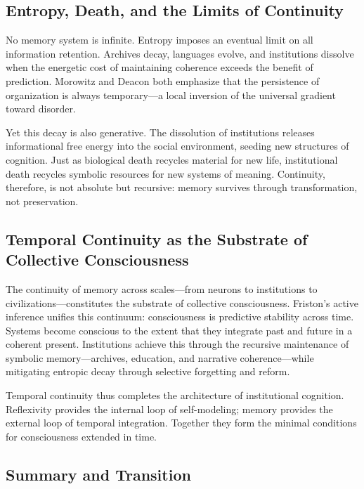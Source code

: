 \documentclass[11pt,a4paper]{article}
\begin{document}
\subsection{Entropy, Death, and the Limits of Continuity}

No memory system is infinite.  Entropy imposes an eventual limit on all information retention.  Archives decay, languages evolve, and institutions dissolve when the energetic cost of maintaining coherence exceeds the benefit of prediction.  Morowitz \citep{Morowitz1968EnergyFlowBiology} and Deacon \citep{Deacon2011IncompleteNature} both emphasize that the persistence of organization is always temporary—a local inversion of the universal gradient toward disorder.

Yet this decay is also generative.  The dissolution of institutions releases informational free energy into the social environment, seeding new structures of cognition.  Just as biological death recycles material for new life, institutional death recycles symbolic resources for new systems of meaning.  Continuity, therefore, is not absolute but recursive: memory survives through transformation, not preservation.

\subsection{Temporal Continuity as the Substrate of Collective Consciousness}

The continuity of memory across scales—from neurons to institutions to civilizations—constitutes the substrate of collective consciousness.  Friston’s active inference unifies this continuum: consciousness is predictive stability across time.  Systems become conscious to the extent that they integrate past and future in a coherent present.  Institutions achieve this through the recursive maintenance of symbolic memory—archives, education, and narrative coherence—while mitigating entropic decay through selective forgetting and reform.

Temporal continuity thus completes the architecture of institutional cognition.  Reflexivity provides the internal loop of self-modeling; memory provides the external loop of temporal integration.  Together they form the minimal conditions for consciousness extended in time.

\subsection{Summary and Transition}
\end{document}
